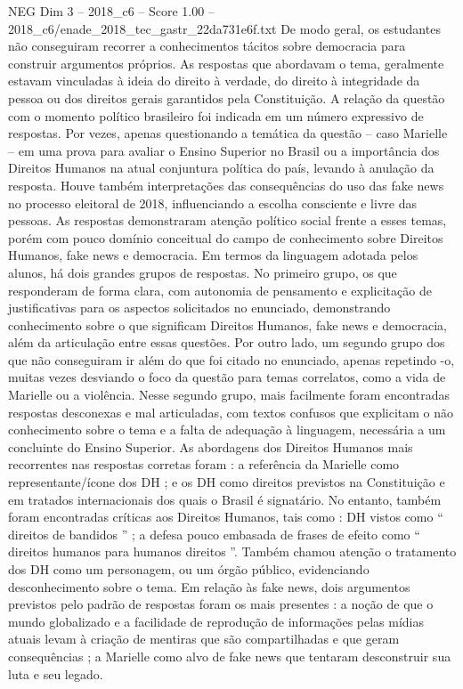 \begin{textsample}{NEG Dim 3 – 2018\_c6 – Score 1.00 – 2018\_c6/enade\_2018\_tec\_gastr\_22da731e6f.txt}
De modo geral, os estudantes não conseguiram recorrer a conhecimentos tácitos sobre democracia para construir argumentos próprios.
As respostas que abordavam o tema, geralmente estavam vinculadas à ideia do direito à verdade, do direito à integridade da pessoa ou dos direitos gerais garantidos pela Constituição.
A relação da questão com o momento político brasileiro foi indicada em um número expressivo de respostas.
Por vezes, apenas questionando a temática da questão – caso Marielle – em uma prova para avaliar o Ensino Superior no Brasil ou a importância dos Direitos Humanos na atual conjuntura política do país, levando à anulação da resposta.
Houve também interpretações das consequências do uso das fake news no processo eleitoral de 2018, influenciando a escolha consciente e livre das pessoas.
As respostas demonstraram atenção político social frente a esses temas, porém com pouco domínio conceitual do campo de conhecimento sobre Direitos Humanos, fake news e democracia.
Em termos da linguagem adotada pelos alunos, há dois grandes grupos de respostas.
No primeiro grupo, os que responderam de forma clara, com autonomia de pensamento e explicitação de justificativas para os aspectos solicitados no enunciado, demonstrando conhecimento sobre o que significam Direitos Humanos, fake news e democracia, além da articulação entre essas questões.
Por outro lado, um segundo grupo dos que não conseguiram ir além do que foi citado no enunciado, apenas repetindo -o, muitas vezes desviando o foco da questão para temas correlatos, como a vida de Marielle ou a violência.
Nesse segundo grupo, mais facilmente foram encontradas respostas desconexas e mal articuladas, com textos confusos que explicitam o não conhecimento sobre o tema e a falta de adequação à linguagem, necessária a um concluinte do Ensino Superior.
As abordagens dos Direitos Humanos mais recorrentes nas respostas corretas foram : a referência da Marielle como representante/ícone dos DH ; e os DH como direitos previstos na Constituição e em tratados internacionais dos quais o Brasil é signatário.
No entanto, também foram encontradas críticas aos Direitos Humanos, tais como : DH vistos como “ direitos de bandidos ” ; a defesa pouco embasada de frases de efeito como “ direitos humanos para humanos direitos ”.
Também chamou atenção o tratamento dos DH como um personagem, ou um órgão público, evidenciando desconhecimento sobre o tema.
Em relação às fake news, dois argumentos previstos pelo padrão de respostas foram os mais presentes : a noção de que o mundo globalizado e a facilidade de reprodução de informações pelas mídias atuais levam à criação de mentiras que são compartilhadas e que geram consequências ; a Marielle como alvo de fake news que tentaram desconstruir sua luta e seu legado.

\end{textsample}
